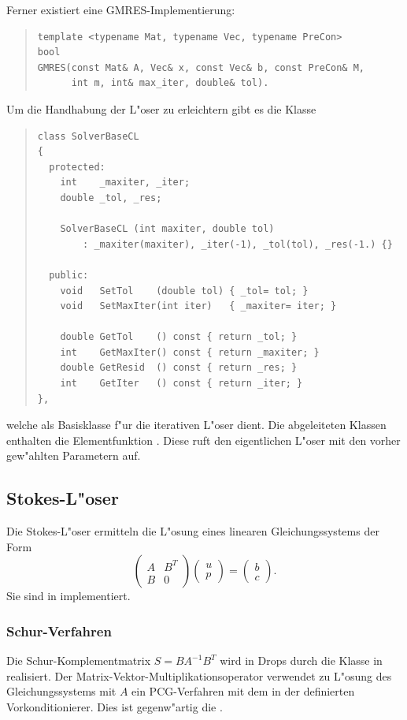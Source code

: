 \documentclass[11pt,a4paper]{article}
\newenvironment{Code}{\begin{quote}\scriptsize}{\end{quote}}
\begin{document}
Ferner existiert eine GMRES-Implementierung:
\begin{Code}
\begin{verbatim}
template <typename Mat, typename Vec, typename PreCon>
bool
GMRES(const Mat& A, Vec& x, const Vec& b, const PreCon& M,
      int m, int& max_iter, double& tol).
\end{verbatim}
\end{Code}
Um die Handhabung der L"oser zu erleichtern gibt es die Klasse
\begin{Code}
\begin{verbatim}
class SolverBaseCL
{
  protected:
    int    _maxiter, _iter;
    double _tol, _res;

    SolverBaseCL (int maxiter, double tol)
        : _maxiter(maxiter), _iter(-1), _tol(tol), _res(-1.) {}

  public:
    void   SetTol    (double tol) { _tol= tol; }
    void   SetMaxIter(int iter)   { _maxiter= iter; }

    double GetTol    () const { return _tol; }
    int    GetMaxIter() const { return _maxiter; }
    double GetResid  () const { return _res; }
    int    GetIter   () const { return _iter; }
},
\end{verbatim}
\end{Code}
welche als Basisklasse f"ur die iterativen L"oser dient. Die abgeleiteten
Klassen enthalten die Elementfunktion . Diese ruft den
eigentlichen L"oser mit den vorher gew"ahlten Parametern auf.

\subsection{Stokes-L"oser}
Die Stokes-L"oser ermitteln die L"osung eines linearen Gleichungssystems der Form
$$
\begin{pmatrix}A & B^T \\ B & 0\end{pmatrix}
\begin{pmatrix}u \\ p\end{pmatrix}
=
\begin{pmatrix}b \\ c\end{pmatrix}.
$$
Sie sind in  implementiert.

\subsubsection{Schur-Verfahren}
Die Schur-Komplementmatrix $S=BA^{-1}B^T$ wird in Drops durch die Klasse
 in  realisiert. Der Matrix-Vektor-Multiplikationsoperator
verwendet zu L"osung des Gleichungssystems mit $A$ ein PCG-Verfahren mit dem
in der  definierten Vorkonditionierer. Dies ist gegenw"artig
die .
\end{document}
